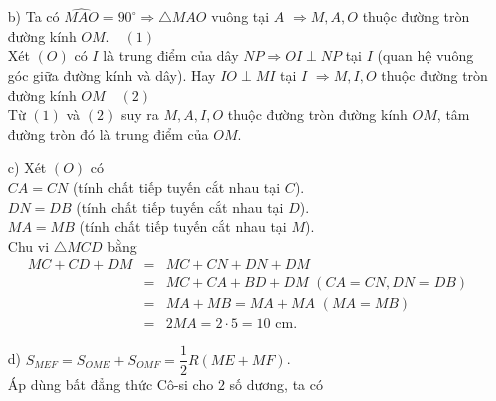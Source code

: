 \begin{bt}
{{}
\begin{enumerate}
\item [b)] Ta có $\widehat{MAO}=90^\circ \Rightarrow \triangle MAO$ vuông tại $A$ $\Rightarrow M, A, O$ thuộc đường tròn đường kính $OM.\quad (1)$\\
Xét $(O)$ có $I$ là trung điểm của dây $NP\Rightarrow OI\perp NP$ tại $I$ (quan hệ vuông góc giữa đường kính và dây). Hay $IO\perp MI$ tại $I$
$\Rightarrow M, I, O$ thuộc đường tròn đường kính $OM\quad (2)$\\
Từ $(1)$ và $(2)$ suy ra $M, A, I, O$ thuộc đường tròn đường kính $OM$, tâm đường tròn đó là trung điểm của $OM$. 
\item[c)] Xét $(O)$ có\\
$CA=CN$ (tính chất tiếp tuyến cắt nhau tại $C$).\\
$DN=DB$ (tính chất tiếp tuyến cắt nhau tại $D$).\\
$MA=MB$ (tính chất tiếp tuyến cắt nhau tại $M$).\\
Chu vi $\triangle MCD$ bằng
{\allowdisplaybreaks
\begin{eqnarray*}
MC+CD+DM &=& MC + CN + DN + DM\\
        &=& MC + CA + BD + DM \,\,(CA = CN, DN= DB)\\
        &=& MA + MB = MA + MA \,\,(MA = MB)\\
        &=& 2MA =2\cdot 5 = 10\,\,\text{cm}.
\end{eqnarray*}
}
\item[d)] $S_{MEF}=S_{OME}+S_{OMF}=\dfrac{1}{2}R(ME+MF)$.\\
Áp dùng bất đẳng thức Cô-si cho $2$ số dương, ta có
{\allowdisplaybreaks
\begin{eqnarray*}

\end{eqnarray*}}
\end{enumerate}}
\end{bt}
